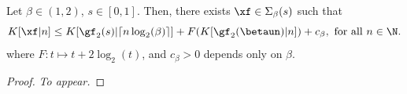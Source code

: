 \begin{corollary}
	Let $\beta \in (1,2)$, $s \in [0,1]$. Then, there exists $\xf\in \Sigma_\beta(s)$ such that
	\begin{equation}\label{eq:generalized algorithmic complexity of beta expansion lower than binary expansion}
		K[\xf|n] \leq  K[\gf_2(s)|\lceil n \log_2(\beta)\rceil] + F(K[\gf_2(\betaun)|n]) + c_\beta, \ \text{for all} \ n \in \N.
	\end{equation}
	where $F : t \mapsto t + 2\log_2(t)$, and $c_\beta > 0$ depends only on $\beta$.
\end{corollary}
\begin{proof}
	\textit{To appear.}
\end{proof}
